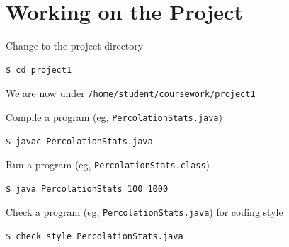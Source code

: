 \documentclass[8pt,a4paper,compress]{beamer}
\begin{document}
\section{Working on the Project}
\begin{frame}[fragile]
\pause\transdissolve

Change to the project directory

\begin{tcolorbox}[enhanced,drop shadow southwest,sharp corners,size=fbox,colback=black]
\begin{lstlisting}[style=terminal]
$ cd project1
\end{lstlisting}
\end{tcolorbox}

\pause\transdissolve\bigskip

We are now under \lstinline{/home/student/coursework/project1}

\pause\transdissolve\bigskip

Compile a program (eg, \lstinline{PercolationStats.java})

\begin{tcolorbox}[enhanced,drop shadow southwest,sharp corners,size=fbox,colback=black]
\begin{lstlisting}[style=terminal]
$ javac PercolationStats.java
\end{lstlisting}
\end{tcolorbox}

\pause\transdissolve\bigskip

Run a program (eg, \lstinline{PercolationStats.class})

\begin{tcolorbox}[enhanced,drop shadow southwest,sharp corners,size=fbox,colback=black]
\begin{lstlisting}[style=terminal]
$ java PercolationStats 100 1000
\end{lstlisting}
\end{tcolorbox}

\pause\transdissolve\bigskip

Check a program (eg, \lstinline{PercolationStats.java}) for coding style

\begin{tcolorbox}[enhanced,drop shadow southwest,sharp corners,size=fbox,colback=black]
\begin{lstlisting}[style=terminal]
$ check_style PercolationStats.java
\end{lstlisting}
\end{tcolorbox}
\end{frame}
\end{document}
